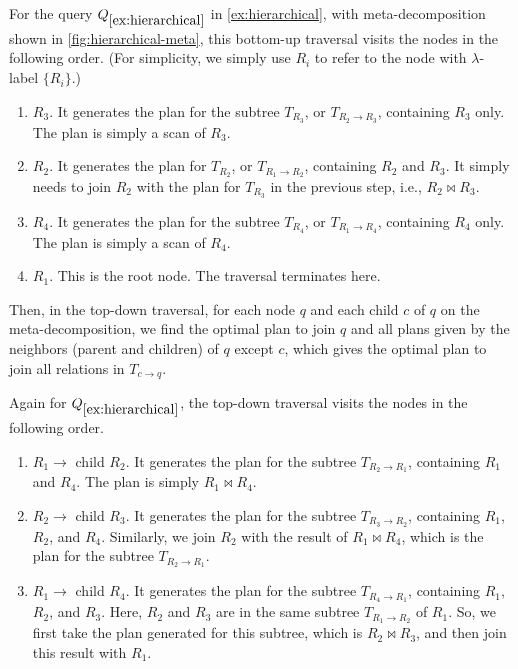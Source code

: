 \begin{example}
    For the query $Q_{\ref{ex:hierarchical}}$ in \cref{ex:hierarchical}, with meta-decomposition shown in \cref{fig:hierarchical-meta}, this bottom-up traversal visits the nodes in the following order. 
    (For simplicity, we simply use $R_i$ to refer to the node with $\lambda$-label $\{ R_i \}$.)
    \begin{enumerate}[leftmargin=*]
        \item $R_3$. It generates the plan for the subtree $T_{R_3}$, or $T_{R_2 \rightarrow R_3}$, containing $R_3$ only. The plan is simply a scan of $R_3$.
        \item $R_2$. It generates the plan for $T_{R_2}$, or $T_{R_1 \rightarrow R_2}$, containing $R_2$ and $R_3$. It simply needs to join $R_2$ with the plan for $T_{R_3}$ in the previous step, i.e., $R_2 \bowtie R_3$.
        \item $R_4$. It generates the plan for the subtree $T_{R_4}$, or $T_{R_1 \rightarrow R_4}$, containing $R_4$ only. The plan is simply a scan of $R_4$.
        \item $R_1$. This is the root node. The traversal terminates here.
    \end{enumerate}
\end{example}

Then, in the top-down traversal, for each node $q$ and each child $c$ of $q$ on the meta-decomposition, we find the optimal plan to join $q$ and all plans given by the neighbors (parent and children) of $q$ except $c$, which gives the optimal plan to join all relations in $T_{c \to q}$.

\begin{example}
    Again for $Q_{\ref{ex:hierarchical}}$, the top-down traversal visits the nodes in the following order.
    \begin{enumerate}[leftmargin=*]
        \item $R_1 \to$ child $R_2$. It generates the plan for the subtree $T_{R_2 \rightarrow R_1}$, containing $R_1$ and $R_4$. The plan is simply $R_1 \bowtie R_4$.
        \item $R_2 \to$ child $R_3$. It generates the plan for the subtree $T_{R_3 \rightarrow R_2}$, containing $R_1$, $R_2$, and $R_4$. Similarly, we join $R_2$ with the result of $R_1 \bowtie R_4$, which is the plan for the subtree $T_{R_2 \rightarrow R_1}$.
        \item $R_1 \to$ child $R_4$. It generates the plan for the subtree $T_{R_4 \rightarrow R_1}$, containing $R_1$, $R_2$, and $R_3$. Here, $R_2$ and $R_3$ are in the same subtree $T_{R_1 \rightarrow R_2}$ of $R_1$. So, we first take the plan generated for this subtree, which is $R_2 \bowtie R_3$, and then join this result with $R_1$.
    \end{enumerate}
\end{example}

